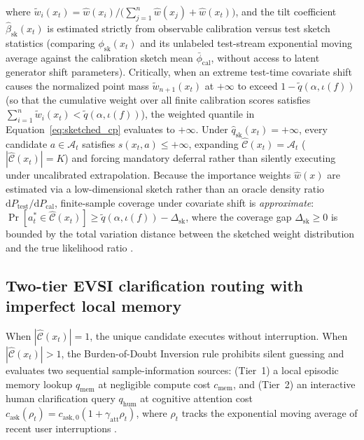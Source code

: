 \documentclass[11pt]{article}
\begin{document}
where $\tilde{w}_i(x_t) = \hat{w}(x_i) / \bigl(\sum_{j=1}^n \hat{w}(x_j) + \hat{w}(x_t)\bigr)$, and the tilt coefficient $\hat{\beta}_{\mathrm{sk}}(x_t)$ is estimated strictly from observable calibration versus test sketch statistics (comparing $\phi_{\mathrm{sk}}(x_t)$ and its unlabeled test-stream exponential moving average against the calibration sketch mean $\bar{\phi}_{\mathrm{cal}}$, without access to latent generator shift parameters). Critically, when an extreme test-time covariate shift causes the normalized point mass $\tilde{w}_{n+1}(x_t)$ at $+\infty$ to exceed $1 - \tilde{q}(\alpha,\allowbreak \iota(f))$ (so that the cumulative weight over all finite calibration scores satisfies $\sum_{i=1}^n \tilde{w}_i(x_t) < \tilde{q}(\alpha,\allowbreak \iota(f))$), the weighted quantile in Equation~\eqref{eq:sketched_cp} evaluates to $+\infty$. Under $\hat{q}_{\mathrm{sk}}(x_t) = +\infty$, every candidate $a \in \mathcal{A}_t$ satisfies $s(x_t,\allowbreak a) \le +\infty$, expanding $\hat{\mathcal{C}}(x_t) = \mathcal{A}_t$ ($|\hat{\mathcal{C}}(x_t)| = K$) and forcing mandatory deferral rather than silently executing under uncalibrated extrapolation. Because the importance weights $\hat{w}(x)$ are estimated via a low-dimensional sketch rather than an oracle density ratio $\mathrm{d}P_{\mathrm{test}}/\mathrm{d}P_{\mathrm{cal}}$, finite-sample coverage under covariate shift is \emph{approximate}: $\Pr[a_t^* \in \hat{\mathcal{C}}(x_t)] \ge \tilde{q}(\alpha,\allowbreak \iota(f)) - \Delta_{\mathrm{sk}}$, where the coverage gap $\Delta_{\mathrm{sk}} \ge 0$ is bounded by the total variation distance between the sketched weight distribution and the true likelihood ratio \citep{vovk2005conformal}.

\subsection{Two-tier EVSI clarification routing with imperfect local memory}

When $|\hat{\mathcal{C}}(x_t)| = 1$, the unique candidate executes without interruption. When $|\hat{\mathcal{C}}(x_t)| > 1$, the Burden-of-Doubt Inversion rule prohibits silent guessing and evaluates two sequential sample-information sources: (Tier~1) a local episodic memory lookup $q_{\mathrm{mem}}$ at negligible compute cost $c_{\mathrm{mem}}$, and (Tier~2) an interactive human clarification query $q_{\mathrm{hum}}$ at cognitive attention cost $c_{\mathrm{ask}}(\rho_t) = c_{\mathrm{ask}, 0}(1 + \gamma_{\mathrm{att}}\rho_t)$, where $\rho_t$ tracks the exponential moving average of recent user interruptions \citep{john1988_14, armin2026rescue}.
\end{document}
